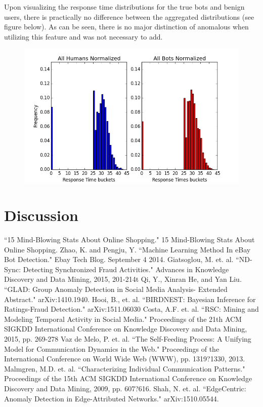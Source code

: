 \documentclass{article} %
\begin{document}
Upon visualizing the response time distributions for the true bots and benign users, there is practically no difference between the aggregated distributions (see figure below).
As can be seen, there is no major distinction of anomalous when utilizing this feature and was not necessary to add.

\begin{figure}[h]
\centering
{\includegraphics[scale=0.5]{img/bird_res_dist.png}}
\end{figure}

\section{Discussion}

\begin{thebibliography}{123}

 ``15 Mind-Blowing Stats About Online Shopping." 15 Mind-Blowing Stats About Online Shopping.
 Zhao, K. and Pengju, Y. ``Machine Learning Method In eBay Bot Detection." Ebay Tech Blog. September 4 2014.
 Giatsoglou, M. et. al. ``ND-Sync: Detecting Synchronized Fraud Activities." Advances in Knowledge Discovery and Data Mining, 2015, 201-214t
 Qi, Y., Xinran He, and Yan Liu. ``GLAD: Group Anomaly Detection in Social Media Analysis- Extended Abstract." arXiv:1410.1940.
 Hooi, B., et. al. ``BIRDNEST: Bayesian Inference for Ratings-Fraud Detection." arXiv:1511.06030
 Costa, A.F. et. al. ``RSC: Mining and Modeling Temporal Activity in Social Media." Proceedings of the 21th ACM SIGKDD International Conference on Knowledge Discovery and Data Mining, 2015, pp. 269-278
 Vaz de Melo, P. et. al. ``The Self-Feeding Process: A Unifying Model for Communication Dynamics in the Web." Proceedings of the International Conference on World Wide Web (WWW), pp. 1319?1330, 2013.
 Malmgren, M.D. et. al. ``Characterizing Individual Communication Patterns." Proceedings of the 15th ACM SIGKDD International Conference on Knowledge Discovery and Data Mining, 2009, pp. 607?616.
 Shah, N. et. al. ``EdgeCentric: Anomaly Detection in Edge-Attributed Networks." arXiv:1510.05544.

\end{thebibliography}
\end{document}
